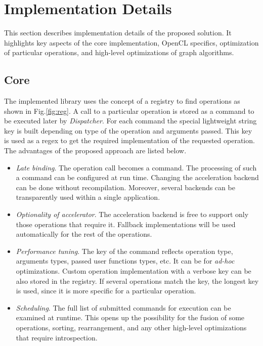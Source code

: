 \section{Implementation Details}

This section describes implementation details of the proposed solution. 
It highlights key aspects of the core implementation, OpenCL specifics, optimization of particular operations, and high-level optimizations of graph algorithms.

\subsection{Core}

The implemented library uses the concept of a registry to find operations as shown in Fig.\ref{fig:reg}. A call to a particular operation is stored as a command to be executed later by \textit{Dispatcher}. For each command the special lightweight string key is built depending on type of the operation and arguments passed. This key is used as a regex to get the required implementation of the requested operation. The advantages of the proposed approach are listed below.

\begin{itemize}
    \item \textit{Late binding}. The operation call becomes a command. The processing of such a command can be configured at run time. Changing the acceleration backend can be done without recompilation. Moreover, several backends can be transparently used within a single application.
    \item \textit{Optionality of accelerator}. The acceleration backend is free to support only those operations that require it. Fallback implementations will be used automatically for the rest of the operations.
    \item \textit{Performance tuning}. The key of the command reflects operation type, arguments types, passed user functions types, etc. It can be for \textit{ad-hoc} optimizations. Custom operation implementation with a verbose key can be also stored in the registry. If several operations match the key, the longest key is used, since it is more specific for a particular operation.
    \item \textit{Scheduling}. The full list of submitted commands for execution can be examined at runtime. This opens up the possibility for the fusion of some operations, sorting, rearrangement, and any other high-level optimizations that require introspection.
\end{itemize}

